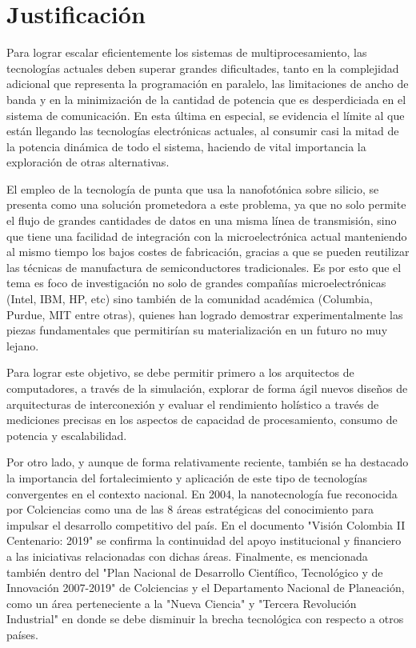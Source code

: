 \section{Justificación}
Para lograr escalar eficientemente los sistemas de multiprocesamiento, las tecnologías 
actuales deben superar grandes dificultades, tanto en la complejidad adicional 
que representa la programación en paralelo, las limitaciones de ancho de banda y en la
minimización de la cantidad de potencia que es desperdiciada en el sistema de comunicación. 
En esta última en especial, se evidencia el límite al que están llegando las 
tecnologías electrónicas actuales, al consumir casi la mitad \cite{Magen2004} de la 
potencia dinámica de todo el sistema, haciendo de vital importancia la 
exploración de otras alternativas.

El empleo de la tecnología de punta que usa la nanofotónica sobre silicio, 
se presenta como una solución prometedora a este
problema, ya que no solo permite el flujo de grandes cantidades de 
datos en una misma línea de transmisión, sino que tiene una facilidad de 
integración con la microelectrónica actual manteniendo al mismo tiempo los 
bajos costes de fabricación, gracias a que se pueden reutilizar las técnicas 
de manufactura de semiconductores tradicionales. Es por esto que el tema es foco de
investigación no solo de grandes compañías microelectrónicas (Intel, IBM, HP, etc) 
sino también de la comunidad académica (Columbia, Purdue, MIT entre otras), 
quienes han logrado demostrar experimentalmente las piezas fundamentales que 
permitirían su materialización en un futuro no muy lejano.

Para lograr este objetivo, se debe permitir primero a los arquitectos de computadores, 
a través de la simulación, explorar de forma ágil nuevos diseños de arquitecturas 
de interconexión y evaluar el rendimiento holístico a través de mediciones 
precisas en los aspectos de capacidad de procesamiento, consumo de potencia y escalabilidad.

Por otro lado, y aunque de forma relativamente reciente, también se ha destacado 
la importancia del fortalecimiento y aplicación de este tipo de tecnologías convergentes 
en el contexto nacional. En 2004, la nanotecnología fue reconocida por Colciencias como
una de las 8 áreas estratégicas del conocimiento para impulsar el desarrollo 
competitivo del país. En el documento "Visión Colombia II Centenario: 2019" 
se confirma la continuidad del apoyo institucional y financiero 
a las iniciativas relacionadas con dichas áreas. 
Finalmente, es mencionada también dentro del 
"Plan Nacional de Desarrollo Científico, Tecnológico y de Innovación 2007-2019" 
de Colciencias y el Departamento Nacional de Planeación, 
como un área perteneciente a la "Nueva Ciencia" y "Tercera Revolución Industrial" 
en donde se debe disminuir la brecha tecnológica con respecto a otros países.

